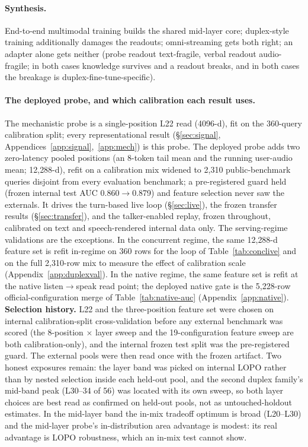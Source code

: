 \paragraph{Synthesis.} End-to-end multimodal training builds the
shared mid-layer core; duplex-style training additionally
damages the readouts; omni-streaming gets both right; an adapter
alone gets neither (probe readout text-fragile, verbal readout
audio-fragile; in both cases knowledge survives and a readout breaks,
and in both cases the breakage is duplex-fine-tune-specific).

\paragraph{The deployed probe, and which calibration each result
uses.} The mechanistic probe is a single-position L22 read (4096-d),
fit on the 360-query calibration split; every representational result
(\S\ref{sec:signal}, Appendices~\ref{app:signal},~\ref{app:mech}) is
this probe. The deployed probe adds two zero-latency
pooled positions (an 8-token tail mean and the running user-audio
mean; 12{,}288-d), refit on a calibration mix widened to 2{,}310 public-benchmark
queries disjoint from every evaluation benchmark; a pre-registered
guard held (frozen internal test AUC 0.860$\to$0.879) and feature
selection never saw the externals. It drives the turn-based live loop
(\S\ref{sec:live}), the frozen transfer results (\S\ref{sec:transfer}),
and the talker-enabled replay, frozen throughout, calibrated on text and
speech-rendered internal data only. The serving-regime validations are
the exceptions. In the concurrent regime, the same 12{,}288-d feature
set is refit in-regime on 360 rows for the loop of
Table~\ref{tab:conclive} and on the full 2{,}310-row mix to measure the
effect of calibration scale (Appendix~\ref{app:duplexval}). In the
native regime, the same feature set is refit at the native
listen$\to$speak read point; the deployed native gate is the
5{,}228-row official-configuration merge of
Table~\ref{tab:native-auc} (Appendix~\ref{app:native}).
\textbf{Selection history.} L22 and the three-position feature set were
chosen on internal calibration-split cross-validation before any
external benchmark was scored (the 8-position $\times$ layer sweep and
the 19-configuration feature sweep are both calibration-only), and
the internal frozen test split was the pre-registered guard. The
external pools were then read once with the frozen artifact. Two
honest exposures remain: the layer band was picked on internal
LOPO rather than by nested selection inside each held-out pool, and
the second duplex family's mid-band peak (L30--34 of 56) was located
with its own sweep, so both layer choices are best read as
confirmed on held-out pools, not as untouched-holdout
estimates. In the mid-layer band the in-mix
tradeoff optimum is broad (L20--L30) and the mid-layer probe's
in-distribution area advantage is modest: its real advantage is
LOPO robustness, which an in-mix test cannot show.

